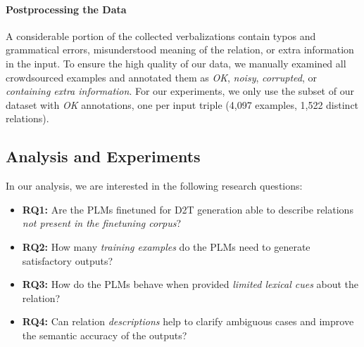 \paragraph{Postprocessing the Data}
A considerable portion of the collected verbalizations contain typos and grammatical errors, misunderstood meaning of the relation, or extra information in the input. To ensure the high quality of our data, we manually examined all crowdsourced examples and annotated them as \textit{OK}, \textit{noisy}, \textit{corrupted}, or \textit{containing extra information}. For our experiments, we only use the subset of our dataset with \textit{OK} annotations, one per input triple (4,097 examples, 1,522 distinct relations).


\subsection{Analysis and Experiments}
\label{sec:rel2text:analysis}
In our analysis, we are interested in the following research questions:
\begin{itemize}
    \item \textbf{RQ1:} Are the PLMs finetuned for D2T generation able to describe relations \textit{not present in the finetuning corpus}?
    \item \textbf{RQ2:} How many \textit{training examples} do the PLMs need to generate satisfactory outputs?
    \item \textbf{RQ3:} How do the PLMs behave when provided \textit{limited lexical cues} about the relation?
    \item \textbf{RQ4:} Can relation \textit{descriptions} help to clarify ambiguous cases and improve the semantic accuracy of the outputs?
\end{itemize}

